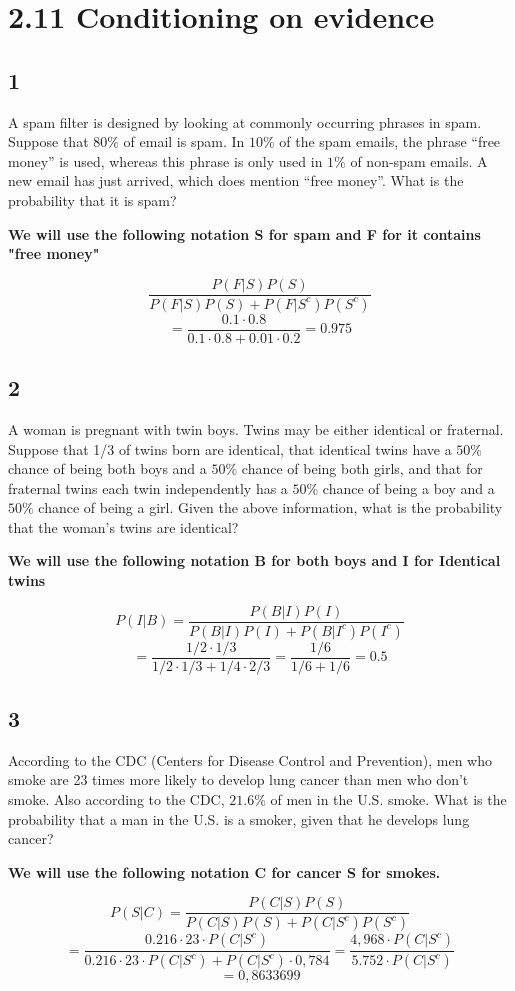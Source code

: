 \documentclass{article}
\begin{document}
\section{2.11 Conditioning on evidence}
\subsection{1}A spam filter is designed by looking at commonly occurring phrases in spam. Suppose that $80\%$ of email is spam. In $10\%$ of the spam emails, the phrase “free money” is used, whereas this phrase is only used in $1\%$ of non-spam emails. A new email has just arrived, which does mention “free money”. What is the probability that it is spam?


\textbf{We will use the following notation S for spam and F for it contains "free money"}

$$\frac{P(F|S)P(S)}{P(F|S)P(S)+P(F|S^c)P(S^c)}$$
$$=\frac{0.1 \cdot 0.8}{0.1 \cdot 0.8 + 0.01 \cdot 0.2}=0.975$$
\subsection{2}A woman is pregnant with twin boys. Twins may be either identical or fraternal. Suppose that 1/3 of twins born are identical, that identical twins have a $50\%$ chance of being both boys and a $50\%$ chance of being both girls, and that for fraternal twins each twin independently has a $50\%$ chance of being a boy and a $50\%$ chance of being a girl. Given the above information, what is the probability that the woman’s twins are identical?

\textbf{We will use the following notation B for both boys and I for Identical twins
}

$$P(I|B)=\frac{P(B|I)P(I)}{P(B|I)P(I)+P(B|I^c)P(I^c)}$$
$$=\frac{1/2 \cdot 1/3}{1/2 \cdot 1/3 +1/4 \cdot 2/3}=\frac{1/6}{1/6+1/6}=0.5$$
\subsection{3}According to the CDC (Centers for Disease Control and Prevention), men who smoke are 23 times more likely to develop lung cancer than men who don’t smoke. Also according to the CDC, $21.6\%$ of men in the U.S. smoke. What is the probability that a man in the U.S. is a smoker, given that he develops lung cancer?

\textbf{We will use the following notation C for cancer S for smokes.}

$$P(S|C)=\frac{P(C|S)P(S)}{P(C|S)P(S)+P(C|S^c)P(S^c)}$$
$$=\frac{0.216 \cdot 23 \cdot P(C|S^c)}{0.216 \cdot 23 \cdot P(C|S^c)+P(C|S^c)\cdot 0,784}=\frac{4,968 \cdot P(C|S^c)}{5.752 \cdot P(C|S^c)}$$
$$=0,8633699$$
\end{document}
